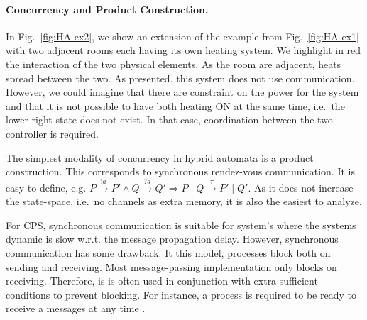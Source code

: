 \documentclass[
graybox,
envcountchap
]{svmult}
\begin{document}
\begin{bibunit}
\paragraph{Concurrency and Product Construction.}
In Fig.~\ref{fig:HA-ex2}, we show an extension of the example from Fig.~\ref{fig:HA-ex1} with two adjacent rooms each having its own heating system.
We highlight in {\color{red!90!black}red} the interaction of the two physical elements.
As the room are adjacent, heats spread between the two.
As presented, this system does not use communication.
However, we could imagine that there are constraint on the power for the system and that it is not possible to have both heating ON at the same time, i.e.~the lower right state does not exist.
In that case, coordination between the two controller is required.


The simplest modality of concurrency in hybrid automata is a product construction.
This corresponds to synchronous rendez-vous communication.
It is easy to define, e.g. $P \stackrel{!a}{\rightarrow} P' \land Q \stackrel{?a}{\rightarrow} Q' \Rightarrow P \mid Q \stackrel{\tau}{\rightarrow} P' \mid Q'$.
As it does not increase the state-space, i.e.~no channels as extra memory, it is also the easiest to analyze.

For CPS, synchronous communication is suitable for system's where the systems dynamic is slow w.r.t. the message propagation delay.
However, synchronous communication has some drawback.
It this model, processes block both on sending and receiving.
Most message-passing implementation only blocks on receiving.
Therefore, is is often used in conjunction with extra sufficient conditions to prevent blocking.
For instance, a process is required to be ready to receive a messages at any time \cite{?}. 


\end{bibunit}
\end{document}
